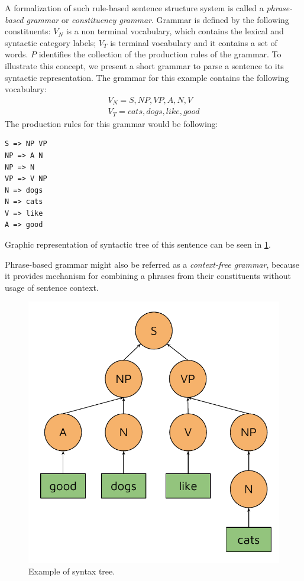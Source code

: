 A formalization of such rule-based sentence structure system is called a \emph{phrase-based grammar} or \emph{constituency grammar}. Grammar is defined by the following constituents:
$V_N$ is a non terminal vocabulary, which contains the lexical and syntactic category labels;
$V_T$ is terminal vocabulary and it contains a set of words.
$P$ identifies the collection of the production rules of the grammar.
To illustrate this concept, we present a short grammar to parse a sentence  to its syntactic representation. The grammar for this example contains the following vocabulary:
\begin{equation}
\begin{split}
V_N = {S, NP, VP, A, N, V}\\
V_T = {cats, dogs, like, good}
\end{split}
\end{equation}
The production rules for this grammar would be following:
\begin{verbatim}
S => NP VP
NP => A N
NP => N
VP => V NP
N => dogs
N => cats
V => like
A => good
\end{verbatim}
Graphic representation of syntactic tree  of this sentence can be seen in \cref{fig:syntax_tree}.

Phrase-based grammar might also be referred as a \emph{context-free grammar}, because it provides mechanism for combining a phrases from their constituents without usage of sentence context.

\begin{figure}
\centering
\includegraphics{Figures/syntaxtree}
\decoRule
\caption[Syntax tree]{Example of syntax tree.}
\label{fig:syntax_tree}
\end{figure}

